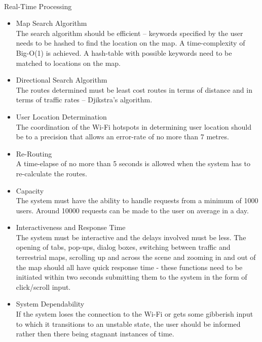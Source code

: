 \documentclass[runningheads,a4paper]{article}
\begin{document}

\noindent \\ Real-Time Processing

\begin{itemize}
\item Map Search Algorithm\\The search algorithm should be efficient – keywords specified by the user needs to be hashed to find the location on the map. A time-complexity of Big-O(1) is achieved. A hash-table with possible keywords need to be matched to locations on the map.

\item Directional Search Algorithm\\The routes determined must be least cost routes in terms of distance and in terms of traffic rates – Djikstra’s algorithm.

\item User Location Determination\\The coordination of the Wi-Fi hotspots in determining user location should be to a precision that allows an error-rate of no more than 7 metres.

\item Re-Routing\\A time-elapse of no more than 5 seconds is allowed when the system has to re-calculate the routes.

\item Capacity\\The system must have the ability to handle requests from a minimum of 1000 users. Around 10000 requests can be made to the user on average in a day.

\item Interactiveness and Response Time\\The system must be interactive and the delays involved must be less. The opening of tabs, pop-ups, dialog boxes, switching between traffic and terrestrial maps, scrolling up and across the scene and zooming in and out of the map should all have quick response time - these functions need to be initiated within two seconds submitting them to the system in the form of click/scroll input.

\item System Dependability\\If the system loses the connection to the Wi-Fi or gets some gibberish input to which it transitions to an unstable state, the user should be informed rather then there being stagnant instances of time.

\end{itemize}
\end{document}
